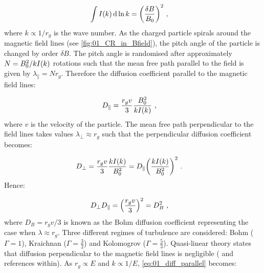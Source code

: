 \begin{equation}
    \begin{aligned}
        \int I\qty(k) \dd{\ln k}&= \qty(\frac{\delta B}{B_0})^2\text{ ,}
    \end{aligned}
\end{equation}
\noindent where $k\propto 1/r_g$ is the wave number. As the charged particle spirals around the magnetic field lines (see \autoref{fig:01_CR_in_Bfield}), the pitch angle of the particle is changed by order $\delta B$. The pitch angle is randomised after approximately $N=B_0^2/kI\qty(k)$ rotations such that the mean free path parallel to the field is given by $\lambda_\parallel=Nr_g$. Therefore the diffusion coefficient parallel to the magnetic field lines:

\begin{equation}
    \begin{aligned}
        D_\parallel&=\frac{r_gv}{3}\frac{B_0^2}{kI\qty(k)}\text{ ,}
    \end{aligned} \label{eq:01_diff_parallel}
\end{equation}
\noindent where $v$ is the velocity of the particle. The mean free path perpendicular to the field lines takes values $\lambda_\perp\approx r_g$ such that the perpendicular diffusion coefficient becomes:

\begin{equation}
    \begin{aligned}
        D_\perp&=\frac{r_gv}{3}\frac{kI\qty(k)}{B_0^2}=D_\parallel\qty(\frac{kI\qty(k)}{B_0^2})^2\text{ .}
    \end{aligned}
\end{equation}
\noindent Hence:

\begin{equation}
    \begin{aligned}
        D_\perp D_\parallel&=\qty(\frac{r_gv}{3})^2=D_B^2\text{ ,}
    \end{aligned}
\end{equation}
\noindent where $D_B=r_gv/3$ is known as the Bohm diffusion coefficient representing the case when $\lambda\approx r_g$.
\newpar 
Three different regimes of turbulence are considered: Bohm ($\Gamma=1$), Kraichnan ($\Gamma=\frac{3}{2}$) and Kolomogrov ($\Gamma=\frac{5}{3}$). Quasi-linear theory states that diffusion perpendicular to the magnetic field lines is negligible (\cite{2016MNRAS.461.3552N} and references within). As $r_g\propto E$ and $k\propto 1/E$, \autoref{eq:01_diff_parallel} becomes:

